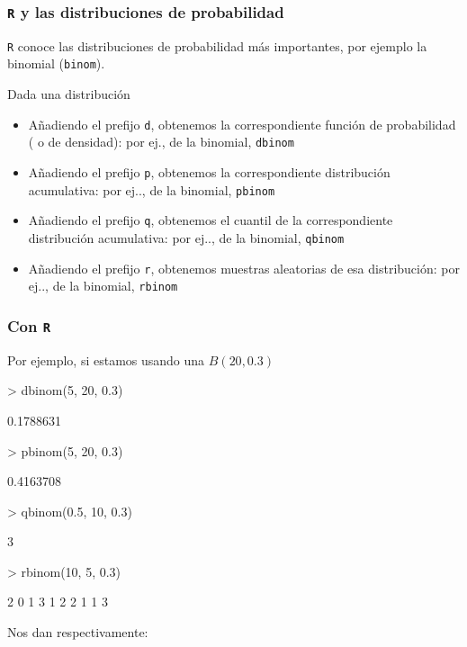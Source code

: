 \begin{frame}
\frametitle{\texttt{R} y las distribuciones de probabilidad}
\texttt{R} conoce las distribuciones de probabilidad más importantes, por ejemplo la binomial (\texttt{binom}).
\medskip

Dada una distribución
\begin{itemize}
\item Añadiendo el prefijo \texttt{d}, obtenemos la correspondiente función de probabilidad ( o de densidad): por ej., de la binomial, \texttt{dbinom}

\item Añadiendo el prefijo \texttt{p}, obtenemos la correspondiente distribución acumulativa: por ej.., de la binomial, \texttt{pbinom}

\item Añadiendo el prefijo \texttt{q}, obtenemos el cuantil de  la correspondiente distribución acumulativa: por ej.., de la binomial, \texttt{qbinom}
\item Añadiendo el prefijo \texttt{r}, obtenemos muestras aleatorias de esa distribución: por ej.., de la binomial, \texttt{rbinom}
\end{itemize}
\end{frame}

\begin{frame}[fragile]
\frametitle{Con  \texttt{R}}
Por ejemplo, si estamos usando una  $B(20,0.3)$

\begin{Schunk}
\begin{Sinput}
> dbinom(5, 20, 0.3)
\end{Sinput}
\begin{Soutput}
[1] 0.1788631
\end{Soutput}
\begin{Sinput}
> pbinom(5, 20, 0.3)
\end{Sinput}
\begin{Soutput}
[1] 0.4163708
\end{Soutput}
\begin{Sinput}
> qbinom(0.5, 10, 0.3)
\end{Sinput}
\begin{Soutput}
[1] 3
\end{Soutput}
\begin{Sinput}
> rbinom(10, 5, 0.3)
\end{Sinput}
\begin{Soutput}
 [1] 2 0 1 3 1 2 2 1 1 3
\end{Soutput}
\end{Schunk}



Nos dan respectivamente:
\end{frame}


